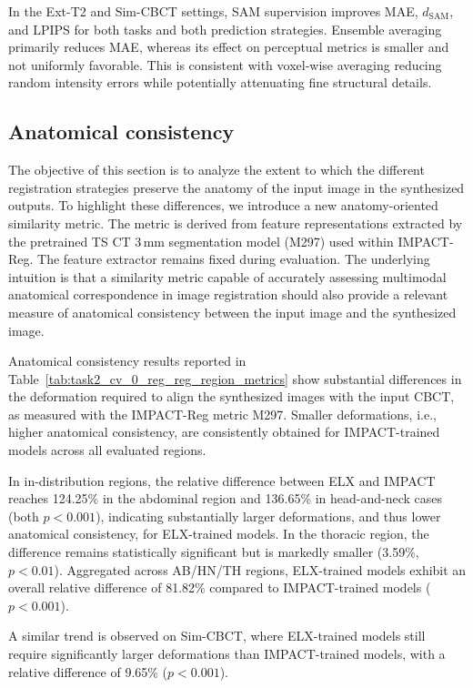 \documentclass[lettersize,journal]{IEEEtran}
\begin{document}
In the Ext-T2 and Sim-CBCT settings, SAM supervision improves MAE, $d_{\mathrm{SAM}}$, and LPIPS for both tasks and both prediction strategies. Ensemble averaging primarily reduces MAE, whereas its effect on perceptual metrics is smaller and not uniformly favorable. This is consistent with voxel-wise averaging reducing random intensity errors while potentially attenuating fine structural details.

\subsection{Anatomical consistency}

The objective of this section is to analyze the extent to which the different registration strategies preserve the anatomy of the input image in the synthesized outputs. 
To highlight these differences, we introduce a new anatomy-oriented similarity metric. The metric is derived from feature representations extracted by the pretrained TS CT 3\,mm segmentation model (M297) used within IMPACT-Reg. The feature extractor remains fixed during evaluation. The underlying intuition is that a similarity metric capable of accurately assessing multimodal anatomical correspondence in image registration should also provide a relevant measure of anatomical consistency between the input image and the synthesized image.

Anatomical consistency results reported in Table~\ref{tab:task2_cv_0_reg_reg_region_metrics} show substantial differences in the deformation required to align the synthesized images with the input CBCT, as measured with the IMPACT-Reg metric M297. Smaller deformations, i.e., higher anatomical consistency, are consistently obtained for IMPACT-trained models across all evaluated regions.

In in-distribution regions, the relative difference between ELX and IMPACT reaches 124.25\% in the abdominal region and 136.65\% in head-and-neck cases (both $p<0.001$), indicating substantially larger deformations, and thus lower anatomical consistency, for ELX-trained models. In the thoracic region, the difference remains statistically significant but is markedly smaller (3.59\%, $p<0.01$). Aggregated across AB/HN/TH regions, ELX-trained models exhibit an overall relative difference of 81.82\% compared to IMPACT-trained models ($p<0.001$).

A similar trend is observed on Sim-CBCT, where ELX-trained models still require significantly larger deformations than IMPACT-trained models, with a relative difference of 9.65\% ($p<0.001$).
\end{document}
